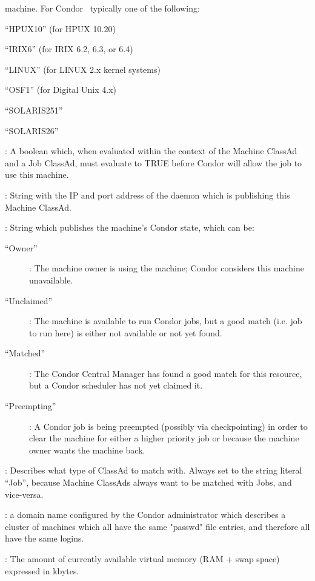 \begin{description}
machine.  For Condor \VersionNotice\ typically one of the following:
	\begin{description}
	\item ``HPUX10'' (for HPUX 10.20)
	\item ``IRIX6''  (for IRIX 6.2, 6.3, or 6.4)
	\item ``LINUX''  (for LINUX 2.x kernel systems)
	\item ``OSF1''	 (for Digital Unix 4.x)
	\item ``SOLARIS251''
	\item ``SOLARIS26''
	\end{description}
%
\item[Requirements] : A boolean which, when evaluated within the context
of the Machine ClassAd and a Job ClassAd, must evaluate to
TRUE before Condor will allow the job to use this machine.
%
\item[StartdIpAddr] : String with the IP and port address of the
 daemon which is publishing this Machine ClassAd.
%
\item[State] : String which publishes the machine's Condor state, which
can be:
	\begin{description}
	\item[``Owner''] : The machine owner is using the machine; Condor
considers this machine unavailable.
	\item[``Unclaimed''] : The machine is available to run Condor jobs,
but a good match (i.e. job to run here) is either not available or not 
yet found.
	\item[``Matched''] : The Condor Central Manager has found a good
match for this resource, but a Condor scheduler has not yet claimed it.
	\item[``Preempting''] : A Condor job is being preempted (possibly
via checkpointing) in order to clear the machine for either a higher
priority job or because the machine owner wants the machine back.
	\end{description}   %
%
\item[TargetType] : Describes what type of ClassAd to match with.
Always set to the string literal ``Job'', because Machine ClassAds
always want to be matched with Jobs, and vice-versa.
%
\item[UidDomain] : a domain name configured by the Condor 
administrator which describes a cluster of machines which all have 
the same "passwd" file entries, and therefore all have the same logins.
%
\item[VirtualMemory] : The amount of currently available virtual memory 
(RAM + swap space) expressed in kbytes.

\end{description}
